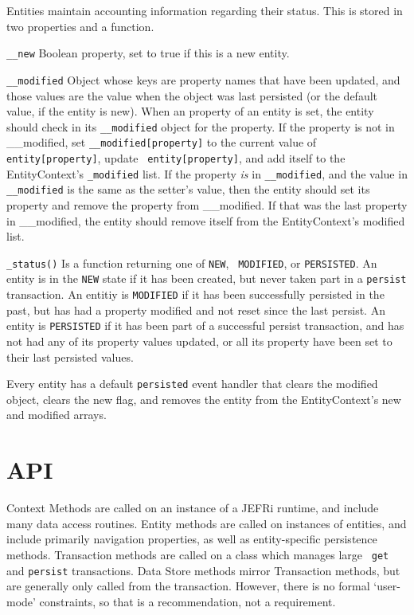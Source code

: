 \documentclass{article}
\newcommand{\ilcode}{\tt}
\begin{document}
Entities maintain accounting information regarding their status. This is stored
in two properties and a function.

{\ilcode \_\_new} Boolean property, set to true if this is a new entity.

{\ilcode \_\_modified} Object whose keys are property names that have been
updated, and those values are the value when the object was last persisted (or
the default value, if the entity is new). When an property of an entity is set,
the entity should check in its {\ilcode \_\_modified} object for the property.
If the property is not in \_\_modified, set {\ilcode \_\_modified[property]} to
the current value of {\ilcode entity[property]}, update {\ilcode
entity[property]}, and add itself to the EntityContext's {\ilcode \_modified}
list. If the property {\it  is} in {\ilcode \_\_modified}, and the value in
{\ilcode \_\_modified} is the same as the setter's value, then the entity should
set its property and remove the property from \_\_modified. If that was the last
property in \_\_modified, the entity should remove itself from the
EntityContext's modified list.

{\ilcode \_status()} Is a function returning one of {\ilcode NEW}, {\ilcode
MODIFIED}, or {\ilcode PERSISTED}. An entity is in the {\ilcode NEW} state if it
has been created, but never taken part in a {\ilcode persist} transaction. An
entitiy is {\ilcode MODIFIED} if it has been successfully persisted in the past,
but has had a property modified and not reset since the last persist. An entity
is {\ilcode PERSISTED} if it has been part of a successful persist transaction,
and has not had any of its property values updated, or all its property have
been set to their last persisted values.

Every entity has a default {\ilcode persisted} event handler that clears the
modified object, clears the new flag, and removes the entity from the
EntityContext's new and modified arrays.

\section{API}

Context Methods are called on an instance of a JEFRi runtime, and include many
data access routines. Entity methods are called on instances of entities, and
include primarily navigation properties, as well as entity-specific persistence
methods. Transaction methods are called on a class which manages large {\ilcode
get} and {\ilcode persist} transactions. Data Store methods mirror Transaction
methods, but are generally only called from the transaction. However, there is
no formal `user-mode' constraints, so that is a recommendation, not a
requirement.
\end{document}
